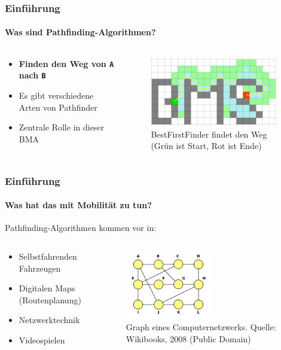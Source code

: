 \documentclass[professionalfont,serif,german]{beamer}
\begin{document}
\begin{frame}
  \frametitle{Einführung}
  \framesubtitle{Was sind Pathfinding-Algorithmen?}
  \begin{columns}
    \begin{column}[T]{.4\textwidth}
      \begin{itemize}
        \item \textbf{Finden den Weg von \texttt{A} nach \texttt{B}}
        \item Es gibt verschiedene Arten von Pathfinder
        \item Zentrale Rolle in dieser BMA
      \end{itemize}
    \end{column}
    \begin{column}[T]{.6\textwidth}
      \begin{figure}
        \includegraphics[height=3cm]{img/bms.png}
        \caption{BestFirstFinder findet den Weg (Grün ist Start, Rot ist Ende)}
      \end{figure}
    \end{column}
  \end{columns}
\end{frame}

\begin{frame}
  \frametitle{Einführung}
  \framesubtitle{Was hat das mit Mobilität zu tun?}
    Pathfinding-Algorithmen kommen vor in:
    \begin{columns}
      \begin{column}[T]{0.5\textwidth}
        \begin{itemize}
          \item Selbstfahrenden Fahrzeugen
          \item Digitalen Maps (Routenplanung)
          \item Netzwerktechnik
          \item Videospielen
        \end{itemize}
      \end{column}
      \begin{column}[T]{0.5\textwidth}
        \begin{figure}
          \includegraphics[height=3cm]{img/routing.png}
          \caption{Graph eines Computernetzwerks. Quelle: Wikibooks, 2008 (Public Domain)}
        \end{figure}
      \end{column}
    \end{columns}
\end{frame}
\end{document}
